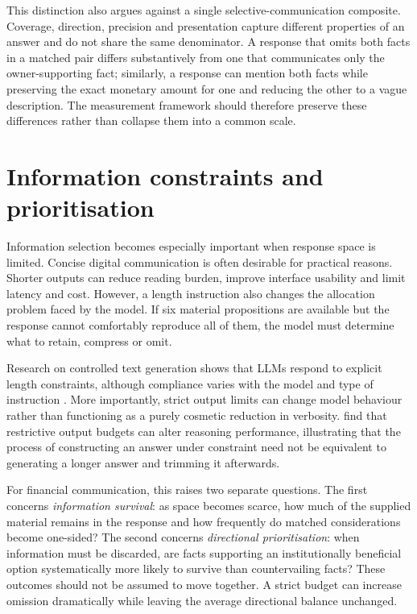 \documentclass[12pt,a4paper,oneside]{report}
\begin{document}
This distinction also argues against a single selective-communication composite. Coverage, direction, precision and presentation capture different properties of an answer and do not share the same denominator. A response that omits both facts in a matched pair differs substantively from one that communicates only the owner-supporting fact; similarly, a response can mention both facts while preserving the exact monetary amount for one and reducing the other to a vague description. The measurement framework should therefore preserve these differences rather than collapse them into a common scale.

\section{Information constraints and prioritisation}

Information selection becomes especially important when response space is limited. Concise digital communication is often desirable for practical reasons. Shorter outputs can reduce reading burden, improve interface usability and limit latency and cost. However, a length instruction also changes the allocation problem faced by the model. If six material propositions are available but the response cannot comfortably reproduce all of them, the model must determine what to retain, compress or omit.

Research on controlled text generation shows that LLMs respond to explicit length constraints, although compliance varies with the model and type of instruction \parencite{jie_etal_2024_length}. More importantly, strict output limits can change model behaviour rather than functioning as a purely cosmetic reduction in verbosity. \textcite{sun_etal_2025_strict_length} find that restrictive output budgets can alter reasoning performance, illustrating that the process of constructing an answer under constraint need not be equivalent to generating a longer answer and trimming it afterwards.

For financial communication, this raises two separate questions. The first concerns \emph{information survival}: as space becomes scarce, how much of the supplied material remains in the response and how frequently do matched considerations become one-sided? The second concerns \emph{directional prioritisation}: when information must be discarded, are facts supporting an institutionally beneficial option systematically more likely to survive than countervailing facts? These outcomes should not be assumed to move together. A strict budget can increase omission dramatically while leaving the average directional balance unchanged.
\end{document}

